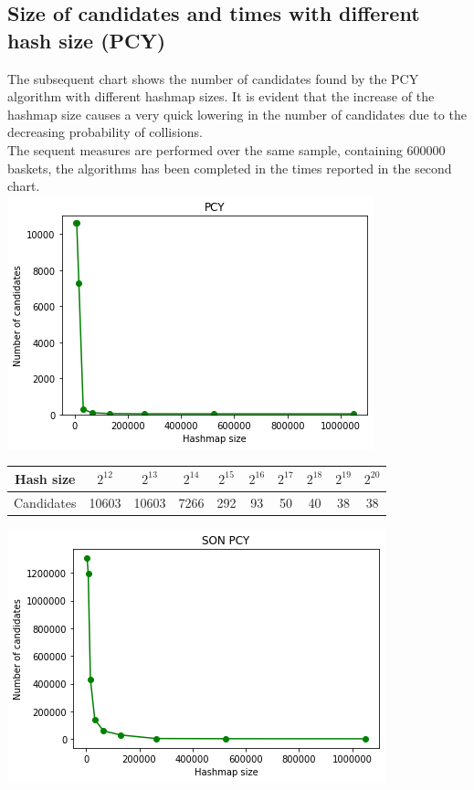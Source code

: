 \documentclass[14pt]{extarticle}
\begin{document}
\subsection{Size of candidates and times with different hash size (PCY)}
The subsequent chart shows the number of candidates found by the PCY algorithm with different hashmap sizes. It is evident that the increase of the hashmap size causes a very quick lowering in the number of candidates due to the decreasing probability of collisions.\\
The sequent measures are performed over the same sample, containing 600000 baskets, the algorithms has been completed in the times reported in the second chart.\\
\includegraphics[scale=1]{size_by_hsize.png}\\
\begin{center}
\begin{tabular}{ |c||c|c|c|c|c|c|c|c|c| } 
 \hline
 Hash size & $2^{12}$ & $2^{13}$ & $2^{14}$ & $2^{15}$ & $2^{16}$ & $2^{17}$ & $2^{18}$ & $2^{19}$ & $2^{20}$ \\
 \hline
 Candidates & 10603 & 10603 & 7266 & 292 & 93 & 50 & 40 & 38 & 38\\
 \hline
\end{tabular}
\end{center}
\includegraphics[scale=1]{sonpcy_candidates.png}\\
\end{document}
